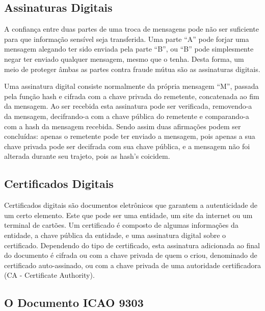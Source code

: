 \documentclass[11pt]{article}
\begin{document}
			

		\subsection{Assinaturas Digitais}
			
			

			A confiança entre duas partes de uma troca de mensagens pode não ser suficiente para que informação sensível seja transferida. Uma parte “A” pode forjar uma mensagem alegando ter sido enviada pela parte “B”, ou “B” pode simplesmente negar ter enviado qualquer mensagem, mesmo que o tenha. Desta forma, um meio de proteger âmbas as partes contra fraude mútua são as assinaturas digitais.
				
			Uma assinatura digital consiste normalmente da própria mensagem ``M'', passada pela função hash e cifrada com a chave privada do remetente, concatenada ao fim da mensagem. Ao ser recebida esta assinatura pode ser verificada, removendo-a da mensagem, decifrando-a com a chave pública do remetente e comparando-a com a hash da mensagem recebida. Sendo assim duas afirmações podem ser concluídas: apenas o remetente pode ter enviado a mensagem, pois apenas a sua chave privada pode ser decifrada com sua chave pública, e a mensagem não foi alterada durante seu trajeto, pois as hash's coicidem.
			
			
			

		\subsection{Certificados Digitais}
			
			
				
			Certificados digitais são documentos eletrônicos que garantem a autenticidade de um certo elemento. Este que pode ser uma entidade, um site da internet ou um terminal de cartões. Um certificado é composto de algumas informações da entidade,  a chave pública da entidade, e uma assinatura digital sobre o certificado. Dependendo do tipo de certificado, esta assinatura adicionada ao final do documento é cifrada ou com a chave privada de quem o criou, denominado de certificado auto-assinado, ou com a chave privada de uma autoridade certificadora (CA - Certificate Authority). 

			
			

    
	\subsection{O Documento ICAO 9303}
		
\end{document}
